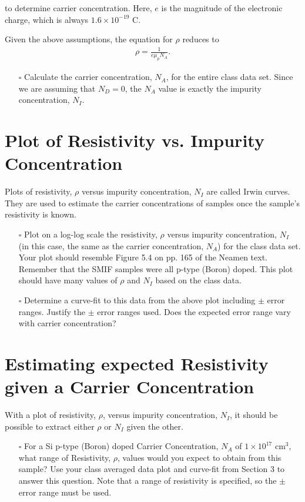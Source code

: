 \documentclass[12pt]{../manual}
\begin{document}
to determine carrier concentration. Here, $e$ is the magnitude of the electronic charge, which is always $1.6 \times 10^{-19}$ C.

Given the above assumptions, the equation for $\rho$ reduces to
\begin{align}
\rho = \frac{1}{e \mu_p N_A}.
\end{align}

\begin{itemize}
\item[$\square$] Calculate the carrier concentration, $N_A$, for the entire class data set. Since we are assuming that $N_D = 0$, the $N_A$ value is exactly the impurity concentration, $N_I$. 
\end{itemize}

\section{Plot of Resistivity vs. Impurity Concentration}

Plots of resistivity, $\rho$ versus impurity concentration, $N_I$ are called Irwin curves.  They are used to estimate the carrier concentrations of samples once the sample's resistivity is known.

\begin{itemize}
\item[$\square$] Plot on a log-log scale the resistivity, $\rho$ versus impurity concentration, $N_I$ (in this case, the same as the carrier concentration, $N_A$) for the class data set.  Your plot should resemble Figure 5.4 on pp. 165 of the Neamen text.  Remember that the SMIF samples were all p-type (Boron) doped.  This plot should have many values of $\rho$ and $N_I$ based on the class data.
\item[$\square$] Determine a curve-fit to this data from the above plot including $\pm$ error ranges.  Justify the $\pm$ error ranges used.  Does the expected error range vary with carrier concentration?
\end{itemize}

\newpage
\section{Estimating expected Resistivity given a Carrier Concentration}

With a plot of resistivity, $\rho$, versus impurity concentration, $N_I$, it should be possible to extract either $\rho$ or $N_I$ given the other.

\begin{itemize}
\item[$\square$] For a Si p-type (Boron) doped Carrier Concentration, $N_A$ of $1 \times 10^{17} \mbox{ cm}^3$, what range of Resistivity, $\rho$, values would you expect to obtain from this sample? Use your class averaged data plot and curve-fit from Section 3 to answer this question. Note that a range of resistivity is specified, so the $\pm$ error range must be used.
\end{itemize}
\end{document}
